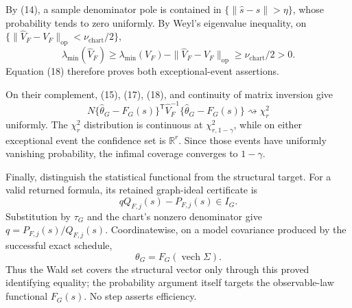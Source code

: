 By (14), a sample denominator pole is contained in \(\{\|\widehat s-s\|>\eta\}\), whose probability tends to zero uniformly.  By Weyl's eigenvalue inequality, on \(\{\|\widehat V_F-V_F\|_{\mathrm{op}}<\nu_{\mathrm{chart}}/2\}\),
\[
 \lambda_{\min}(\widehat V_F)\geq
 \lambda_{\min}(V_F)-\|\widehat V_F-V_F\|_{\mathrm{op}}
 \geq\nu_{\mathrm{chart}}/2>0.
\]
Equation (18) therefore proves both exceptional-event assertions.

On their complement, (15), (17), (18), and continuity of matrix inversion give
\[
 N\{\widehat\theta_G-F_G(s)\}^{\mathsf T}\widehat V_F^{-1}
 \{\widehat\theta_G-F_G(s)\}\rightsquigarrow\chi_r^2
\]
uniformly.  The \(\chi_r^2\) distribution is continuous at \(\chi^2_{r,1-\gamma}\), while on either exceptional event the confidence set is \(\mathbb R^r\).  Since those events have uniformly vanishing probability, the infimal coverage converges to \(1-\gamma\).

Finally, distinguish the statistical functional from the structural target.  For a valid returned formula, its retained graph-ideal certificate is
\[
 qQ_{F,j}(s)-P_{F,j}(s)\in I_G.
\]
Substitution by \(\tau_G\) and the chart's nonzero denominator give \(q=P_{F,j}(s)/Q_{F,j}(s)\).  Coordinatewise, on a model covariance produced by the successful exact schedule,
\[
 \theta_G=F_G(\operatorname{vech}\Sigma).
\]
Thus the Wald set covers the structural vector only through this proved identifying equality; the probability argument itself targets the observable-law functional \(F_G(s)\).  No step asserts efficiency.
